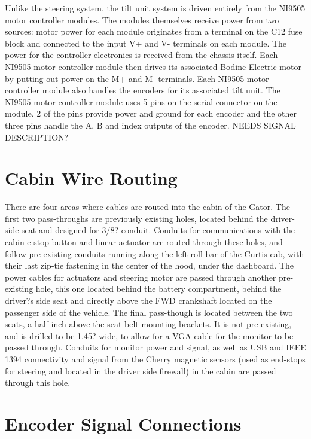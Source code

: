 \noindent Unlike the steering system, the tilt unit system is driven entirely from the NI9505 motor controller modules. The modules themselves receive power from two sources: motor power for each module originates from a terminal on the C12 fuse block and connected to the input V+ and V- terminals on each module. The power for the controller electronics is received from the chassis itself. Each NI9505 motor controller module then drives its associated Bodine Electric motor by putting out power on the M+ and M- terminals. Each NI9505 motor controller module also handles the encoders for its associated tilt unit. The NI9505 motor controller module uses 5 pins on the serial connector on the module. 2 of the pins provide power and ground for each encoder and the other three pins handle the A, B and index outputs of the encoder. NEEDS SIGNAL DESCRIPTION?

\section{Cabin Wire Routing}

There are four areas where cables are routed into the cabin of the Gator. The first two pass-throughs are previously existing holes, located behind the driver-side seat and designed for 3/8? conduit. Conduits for communications with the cabin e-stop button and linear actuator are routed through these holes, and follow pre-existing conduits running along the left roll bar of the Curtis cab, with their last zip-tie fastening in the center of the hood, under the dashboard. The power cables for actuators and steering motor are passed through another pre-existing hole, this one located behind the battery compartment, behind the driver?s side seat and directly above the FWD crankshaft located on the passenger side of the vehicle. The final pass-though is located between the two seats, a half inch above the seat belt mounting brackets. It is not pre-existing, and is drilled to be 1.45? wide, to allow for a VGA cable for the monitor to be passed through. Conduits for monitor power and signal, as well as USB and IEEE 1394 connectivity and signal from the Cherry magnetic sensors (used as end-stops for steering and located in the driver side firewall) in the cabin are passed through this hole.

\newpage

\section{Encoder Signal Connections}

